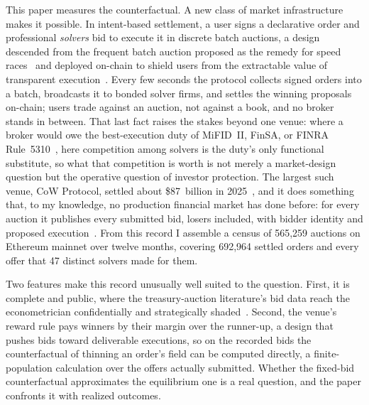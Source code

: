 \documentclass[11pt]{article}
\theoremstyle{plain}
\theoremstyle{definition}
\theoremstyle{remark}
\begin{document}
This paper measures the counterfactual. A new class of market infrastructure makes it possible. In intent-based settlement, a user signs a declarative order and professional \emph{solvers} bid to execute it in discrete batch auctions, a design descended from the frequent batch auction proposed as the remedy for speed races~\citep{budish2015hft} and deployed on-chain to shield users from the extractable value of transparent execution~\citep{daian2020flashboys}. Every few seconds the protocol collects signed orders into a batch, broadcasts it to bonded solver firms, and settles the winning proposals on-chain; users trade against an auction, not against a book, and no broker stands in between. That last fact raises the stakes beyond one venue: where a broker would owe the best-execution duty of MiFID~II, FinSA, or FINRA Rule~5310~\citep{mifid2,finsa,finra5310}, here competition among solvers is the duty's only functional substitute, so what that competition is worth is not merely a market-design question but the operative question of investor protection. The largest such venue, CoW Protocol, settled about \$87~billion in 2025~\citep{cowdao_review2025}, and it does something that, to my knowledge, no production financial market has done before: for every auction it publishes every submitted bid, losers included, with bidder identity and proposed execution~\citep{cow_api}. From this record I assemble a census of 565{,}259 auctions on Ethereum mainnet over twelve months, covering 692{,}964 settled orders and every offer that 47 distinct solvers made for them.

Two features make this record unusually well suited to the question. First, it is complete and public, where the treasury-auction literature's bid data reach the econometrician confidentially and strategically shaded~\citep{hortacsu2010mechanism,kastl2011discrete}. Second, the venue's reward rule pays winners by their margin over the runner-up, a design that pushes bids toward deliverable executions, so on the recorded bids the counterfactual of thinning an order's field can be computed directly, a finite-population calculation over the offers actually submitted. Whether the fixed-bid counterfactual approximates the equilibrium one is a real question, and the paper confronts it with realized outcomes.
\end{document}
